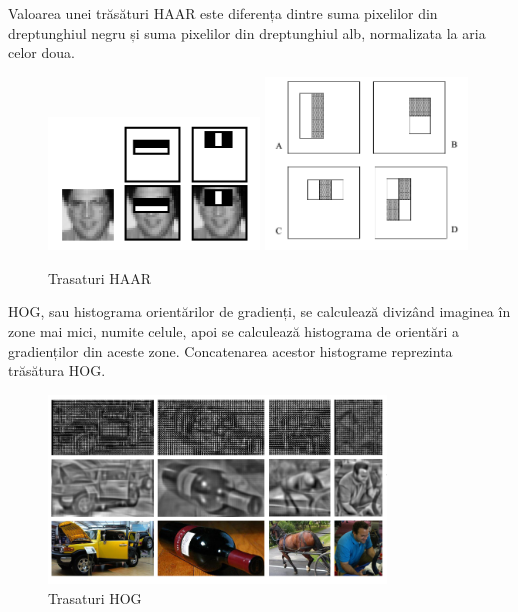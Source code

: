 Valoarea unei trăsături HAAR este diferența dintre suma pixelilor din dreptunghiul negru și suma pixelilor din dreptunghiul alb, normalizata la aria celor doua.
\begin{figure}[H]
	\centering
		\includegraphics[width=0.50\textwidth]{imagini/haar0.png}
		\includegraphics[width=0.48\textwidth]{imagini/haar1.png}
	\caption{Trasaturi HAAR\protect\footnotemark}
	\label{fig:haarfeatures}
\end{figure}

HOG, sau histograma orientărilor de gradienți, se calculează divizând imaginea în zone mai mici, numite celule, apoi se calculează histograma de orientări a gradienților din aceste zone. 
Concatenarea acestor histograme reprezinta trăsătura HOG.
\begin{figure}[H]
	\centering
		\includegraphics[width=0.80\textwidth]{imagini/hog0.png}
	\caption{Trasaturi HOG\protect\footnotemark}
	\label{fig:hog0}
\end{figure}

